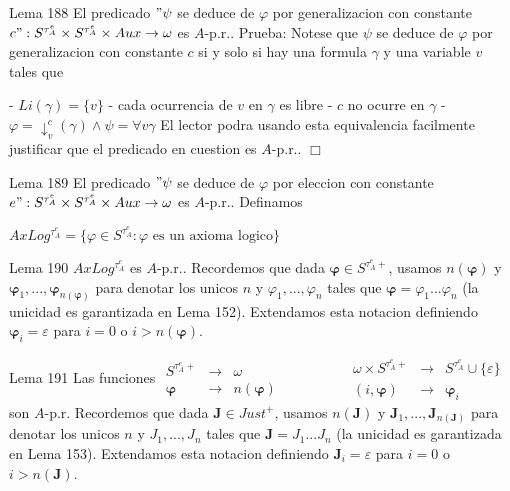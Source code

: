 Lema 188 El predicado \("\psi \) se deduce de \(\varphi \) por generalizacion con constante \(c":S^{\tau _{A}^{e}}\times S^{\tau _{A}^{e}}\times Aux\rightarrow \omega \) es \(A\)-p.r..
Prueba: Notese que \(\psi \) se deduce de \(\varphi \) por generalizacion con constante \( c\) si y solo si hay una formula \(\gamma \) y una variable \(v\) tales que

- \(Li(\gamma )=\{v\}\)
- cada ocurrencia de \(v\) en \(\gamma \) es libre
- \(c\) no ocurre en \(\gamma \)
- \(\varphi =\mathrm{\downarrow }_{v}^{c}(\gamma )\wedge \psi =\forall v\gamma \)
El lector podra usando esta equivalencia facilmente justificar que el predicado en cuestion es \(A\)-p.r.. \(\Box\)

Lema 189 El predicado \("\psi \) se deduce de \(\varphi \) por eleccion con constante \( e":S^{\tau _{A}^{e}}\times S^{\tau _{A}^{e}}\times Aux\rightarrow \omega \) es \(A\)-p.r..
Definamos

\(\displaystyle AxLog^{\tau _{A}^{e}}=\{\varphi \in S^{\tau _{A}^{e}}:\varphi \text{ es un axioma logico}\} \)

Lema 190 \(AxLog^{\tau _{A}^{e}}\) es \(A\)-p.r..
Recordemos que dada \(\mathbf{\varphi }\in S^{\tau _{A}^{e}+}\), usamos \(n( \mathbf{\varphi })\) y \(\mathbf{\varphi }_{1},...,\mathbf{\varphi }_{n( \mathbf{\varphi })}\) para denotar los unicos \(n\) y \(\varphi _{1},...,\varphi _{n}\) tales que \(\mathbf{\varphi }=\varphi _{1}...\varphi _{n}\) (la unicidad es garantizada en Lema 152). Extendamos esta notacion definiendo \(\mathbf{\varphi }_{i}=\varepsilon \) para \(i=0\) o \(i >n( \mathbf{\varphi })\).

Lema 191 Las funciones
\(\displaystyle \begin{array}{ccc} S^{\tau _{A}^{e}+} & \rightarrow & \omega \\ \mathbf{\varphi } & \rightarrow & n(\mathbf{\varphi }) \end{array} \ \ \ \ \ \ \ \ \ \ \ \ \ \ \ \ \ \ \ \ \ \begin{array}{ccc} \omega \times S^{\tau _{A}^{e}+} & \rightarrow & S^{\tau _{A}^{e}}\cup \{\varepsilon \} \\ (i,\mathbf{\varphi }) & \rightarrow & \mathbf{\varphi }_{i} \end{array} \)
son \(A\)-p.r.
Recordemos que dada \(\mathbf{J}\in Just^{+}\), usamos \(n(\mathbf{J})\) y \( \mathbf{J}_{1},...,\mathbf{J}_{n(\mathbf{J})}\) para denotar los unicos \(n\) y \(J_{1},...,J_{n}\) tales que \(\mathbf{J}=J_{1}...J_{n}\) (la unicidad es garantizada en Lema 153). Extendamos esta notacion definiendo \(\mathbf{J}_{i}=\varepsilon \) para \(i=0\) o \(i >n(\mathbf{J })\).


